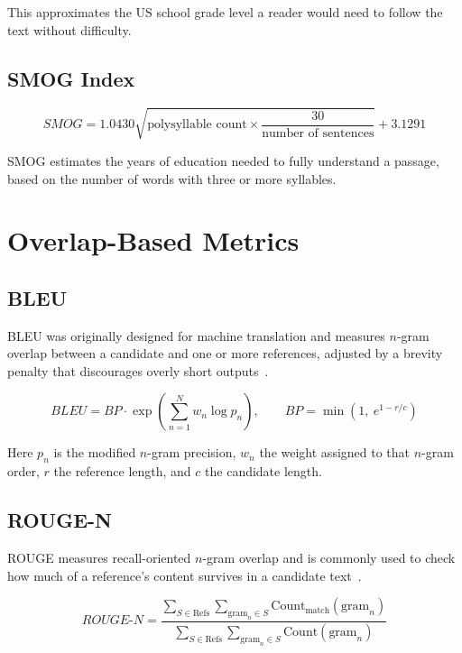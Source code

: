 This approximates the US school grade level a reader would need to follow the text without difficulty.

\subsection*{SMOG Index}

\begin{equation}
    \label{eq:smog}
    SMOG = 1.0430 \sqrt{\text{polysyllable count} \times \dfrac{30}{\text{number of sentences}}} + 3.1291
\end{equation}

SMOG estimates the years of education needed to fully understand a passage, based on the number of words with three or more syllables.

\section{Overlap-Based Metrics}
\label{sec:overlap-metrics}

\subsection*{BLEU}

BLEU was originally designed for machine translation and measures $n$-gram overlap between a candidate and one or more references, adjusted by a brevity penalty that discourages overly short outputs~\cite{papineni2002bleu}.

\begin{equation}
    \label{eq:bleu}
    BLEU = BP \cdot \exp \left( \sum_{n=1}^{N} w_n \log p_n \right), \qquad BP = \min \left( 1,\ e^{1 - r/c} \right)
\end{equation}

Here $p_n$ is the modified $n$-gram precision, $w_n$ the weight assigned to that $n$-gram order, $r$ the reference length, and $c$ the candidate length.

\subsection*{ROUGE-N}

ROUGE measures recall-oriented $n$-gram overlap and is commonly used to check how much of a reference's content survives in a candidate text~\cite{lin2004rouge}.

\begin{equation}
    \label{eq:rouge}
    ROUGE\text{-}N = \frac{\displaystyle\sum_{S \in \text{Refs}} \sum_{\text{gram}_n \in S} \text{Count}_{\text{match}}(\text{gram}_n)}{\displaystyle\sum_{S \in \text{Refs}} \sum_{\text{gram}_n \in S} \text{Count}(\text{gram}_n)}
\end{equation}


